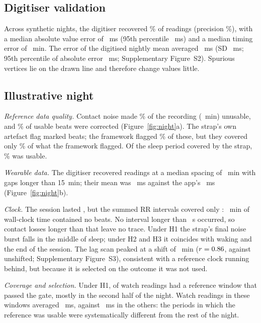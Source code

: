 \documentclass[11pt,a4paper]{article}
\begin{document}
\subsection{Digitiser validation}
Across \nCharts{} synthetic nights, the digitiser recovered \digRecall\% of readings (precision \digPrecision\%), with a median absolute value error of \digValueMedian{}~ms (95th percentile \digValueNinetyFive{}~ms) and a median timing error of \digTimeMedian{}~min. The error of the digitised nightly mean averaged \digMeanErrMean{}~ms (SD \digMeanErrSD{}~ms; 95th percentile of absolute error \digMeanErrNinetyFive{}~ms; Supplementary Figure~S2). Spurious vertices lie on the drawn line and therefore change values little.

\subsection{Illustrative night}
\textit{Reference data quality.} Contact noise made \maskedPct\% of the recording (\maskedMin{}~min) unusable, and \correctedPct\% of usable beats were corrected (Figure~\ref{fig:night}a). The strap's own artefact flag marked \deviceFlagged{} beats; the framework flagged \deviceAlsoFlagPct\% of these, but they covered only \deviceCoveragePct\% of what the framework flagged. Of the sleep period covered by the strap, \usableSleepPct\% was usable.

\textit{Wearable data.} The digitiser recovered \nReadings{} readings at a median spacing of \readingSpacing{}~min with \readingGaps{} gaps longer than 15~min; their mean was \watchDigitized{}~ms against the app's \watchReported{}~ms (Figure~\ref{fig:night}b).

\textit{Clock.} The session lasted \sessionDuration, but the summed RR intervals covered only \rrDuration: \clockDeficitMin{}~min of wall-clock time contained no beats. No interval longer than \maxRRs{}~s occurred, so contact losses longer than that leave no trace. Under H1 the strap's final noise burst falls in the middle of sleep; under H2 and H3 it coincides with waking and the end of the session. The lag scan peaked at a shift of \lagBest{}~min ($r=0.86$, against \lagZeroR{} unshifted; Supplementary Figure~S3), consistent with a reference clock running behind, but because it is selected on the outcome it was not used.

\textit{Coverage and selection.} Under H1, \nValidHOne{} of \nPoints{} watch readings had a reference window that passed the gate, mostly in the second half of the night. Watch readings in these windows averaged \watchMatchedValid{}~ms, against \watchMatchedInvalid{}~ms in the \nInvalidHOne{} others: the periods in which the reference was usable were systematically different from the rest of the night.
\end{document}
